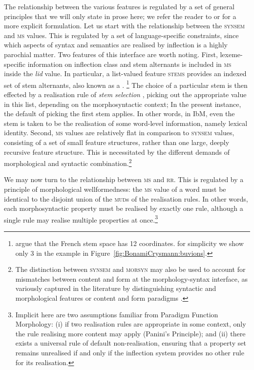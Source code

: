 \documentclass[output=paper]{langsci/langscibook}
\begin{document}
The relationship between the various features is regulated by a set of
general principles that we will  only state in prose here; we refer the
reader to \citet{Bonami13d} or \citet{Crysmann14} for a more explicit
formulation.
Let us start with the relationship between the
\textsc{synsem} and \textsc{ms} values. This is regulated by a set of
language-specific constraints, since which aspects of syntax and
semantics are realised by inflection is a highly parochial matter. Two
features of this interface are worth noting. First, lexeme-specific
information on inflection class and stem alternants is included in
\textsc{ms} inside the \textit{lid} value. In particular, a
list-valued feature \textsc{stems} provides an indexed set of stem
alternants, also known as a  \citep{Bonami06}.%
\footnote{\citet{Bonami06} argue that the French stem space has 12
coordinates. for simplicity we show only 3 in the example in
Figure~\ref{fig:BonamiCrysmann:buvions}.}
The choice of
a particular stem is then effected by a realisation rule of \emph{stem
  selection} \citep{Stump01}, picking out the appropriate value in this
list, depending on the morphosyntactic context; In the present instance,
the default of picking the first stem applies. In other words, in IbM,
even the stem is taken to be the realisation of some word-level
information, namely lexical identity. Second, \textsc{ms} values are
relatively flat in comparison to \textsc{synsem} values, consisting of
a set of small feature structures, rather than one large, deeply
recursive feature structure. This is necessitated by the different
demands of morphological and syntactic combination.\footnote{The
  distinction between \textsc{synsem} and \textsc{morsyn} may also be
  used to account for mismatches between content and form at the
  morphology-syntax interface, as variously captured in the literature
  by distinguishing syntactic and morphological features
  \citep{Sadler:Spencer01,Corbett06,bonami2015} or content and form paradigms
  \citep{Stump06,Stump16}.}

\newpage   
We may now turn to the relationship between \textsc{ms} and
\textsc{rr}. This is regulated by a principle of morphological
wellformedness: the \textsc{ms} value of a word must be identical to
the disjoint union of the \textsc{mud}s of the realisation rules. In
other words, each morphosyntactic property must be realised by exactly
one rule, although a single rule may realise multiple properties at
once.\footnote{Implicit here are two assumptions familiar from
  Paradigm Function Morphology: (i) if two realisation rules are
  appropriate in some context, only the rule realising more content
  may apply (Panini's Principle); and (ii) there exists a universal
  rule of default non-realisation, ensuring that a property set
  remains unrealised if and only if the inflection system provides no
  other rule for its realisation.}
\end{document}
